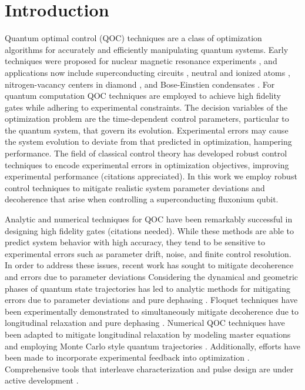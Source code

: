 \section{Introduction}
Quantum optimal control (QOC) techniques are a class of optimization
algorithms for accurately and efficiently manipulating quantum systems.
Early techniques were proposed for nuclear magnetic resonance experiments
\cite{khaneja2005optimal}, and applications now include superconducting
circuits \cite{heeres2017implementing,
  huang2020engineering, leng2019robust, leung2017speedup, xu2020nonadiabatic},
neutral and ionized atoms \cite{van2016optimal}, nitrogen-vacancy centers in
diamond \cite{rembold2020introduction}, and Bose-Einstien condensates
\cite{sorensen2018quantum}. For quantum computation
QOC techniques are employed to achieve high fidelity gates
while adhering to experimental constraints.
The decision variables of the optimization problem are the time-dependent control
parameters, particular to the quantum system, that govern its evolution.
Experimental errors may cause the system evolution to deviate from that predicted in
optimization, hampering performance.
The field of classical control theory has developed robust control techniques
to encode experimental errors in optimization objectives, improving
experimental performance (citations appreciated).
In this work we employ robust control techniques to mitigate
realistic system parameter deviations and decoherence that arise when controlling
a superconducting fluxonium qubit.

Analytic and numerical techniques for QOC have been remarkably successful in
designing high fidelity gates (citations needed). 
While these methods are able to predict system behavior with high accuracy, they tend 
to be sensitive to experimental errors such as parameter drift, noise, and finite control 
resolution. 
In order to address these issues,
recent work has sought to mitigate decoherence
and errors due to parameter deviations
Considering the dynamical and geometric phases of quantum state
trajectories has led to analytic methods for mitigating
errors due to parameter deviations and pure dephasing
\cite{han2020experimental, merrill2014progress, xu2020nonadiabatic, zhang2020universal}.
Floquet techniques have been experimentally demonstrated to simultaneously mitigate
decoherence due to longitudinal relaxation and pure dephasing
\cite{huang2020engineering, mundada2020floquet}.
Numerical QOC techniques have been adapted to mitigate longitudinal relaxation
by modeling master equations \cite{rembold2020introduction} and employing
Monte Carlo style quantum trajectories \cite{abdelhafez2019gradient}.
Additionally, efforts have been made to incorporate experimental feedback
into optimization \cite{huang2020engineering}. Comprehensive tools that interleave characterization
and pulse design are under active development \cite{wittler2020integrated}.

